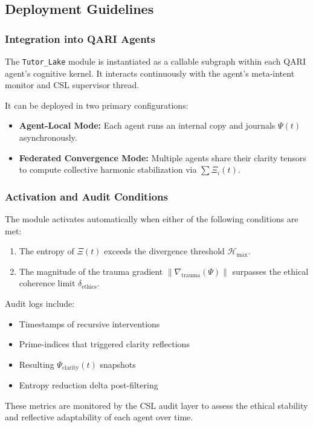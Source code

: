 \documentclass[12pt]{article}
\begin{document}
\subsection{Deployment Guidelines}

\subsubsection*{Integration into QARI Agents}
The \texttt{Tutor\_Lake} module is instantiated as a callable subgraph within each QARI agent’s cognitive kernel. It interacts continuously with the agent’s meta-intent monitor and CSL supervisor thread.

It can be deployed in two primary configurations:
\begin{itemize}
    \item \textbf{Agent-Local Mode:} Each agent runs an internal copy and journals $\Psi(t)$ asynchronously.
    \item \textbf{Federated Convergence Mode:} Multiple agents share their clarity tensors to compute collective harmonic stabilization via $\sum \Xi_i(t)$.
\end{itemize}

\subsubsection*{Activation and Audit Conditions}

The module activates automatically when either of the following conditions are met:
\begin{enumerate}
    \item The entropy of $\Xi(t)$ exceeds the divergence threshold $\mathcal{H}_{\text{max}}$.
    \item The magnitude of the trauma gradient $\|\nabla_{\text{trauma}}(\Psi)\|$ surpasses the ethical coherence limit $\delta_{\text{ethics}}$.
\end{enumerate}

Audit logs include:
\begin{itemize}
    \item Timestamps of recursive interventions
    \item Prime-indices that triggered clarity reflections
    \item Resulting $\Psi_{\text{clarity}}(t)$ snapshots
    \item Entropy reduction delta post-filtering
\end{itemize}

These metrics are monitored by the CSL audit layer to assess the ethical stability and reflective adaptability of each agent over time.
\end{document}
